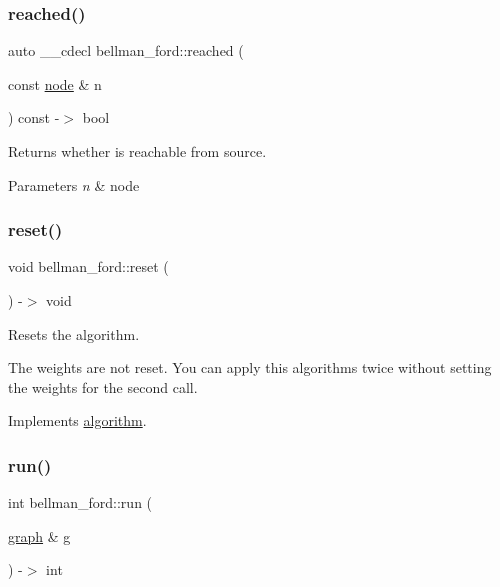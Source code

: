 \subsubsection{\texorpdfstring{reached()}{reached()}}
{\footnotesize\ttfamily auto \+\_\+\+\_\+cdecl bellman\+\_\+ford\+::reached (\begin{DoxyParamCaption}\item[{const \mbox{\hyperlink{classnode}{node}} \&}]{n }\end{DoxyParamCaption}) const -\/$>$ bool \hspace{0.3cm}{\ttfamily [inline]}}



Returns whether is reachable from source. 


\begin{DoxyParams}{Parameters}
{\em n} & node \\
\hline
\end{DoxyParams}
\mbox{\label{classbellman__ford_a6aa4092aaa71b77d634749ded48068e9}} 
\subsubsection{\texorpdfstring{reset()}{reset()}}
{\footnotesize\ttfamily void bellman\+\_\+ford\+::reset (\begin{DoxyParamCaption}{ }\end{DoxyParamCaption}) -\/$>$ void\hspace{0.3cm}{\ttfamily [virtual]}}



Resets the algorithm. 

The weights are not reset. You can apply this algorithms twice without setting the weights for the second call. 

Implements \mbox{\hyperlink{classalgorithm_aea645f2e39976a477c8f8564656fd1b6}{algorithm}}.

\mbox{\label{classbellman__ford_a2c15782095c4fc37eb2a8d66c431c821}} 
\subsubsection{\texorpdfstring{run()}{run()}}
{\footnotesize\ttfamily int bellman\+\_\+ford\+::run (\begin{DoxyParamCaption}\item[{\mbox{\hyperlink{classgraph}{graph}} \&}]{g }\end{DoxyParamCaption}) -\/$>$  int\hspace{0.3cm}{\ttfamily [virtual]}}



